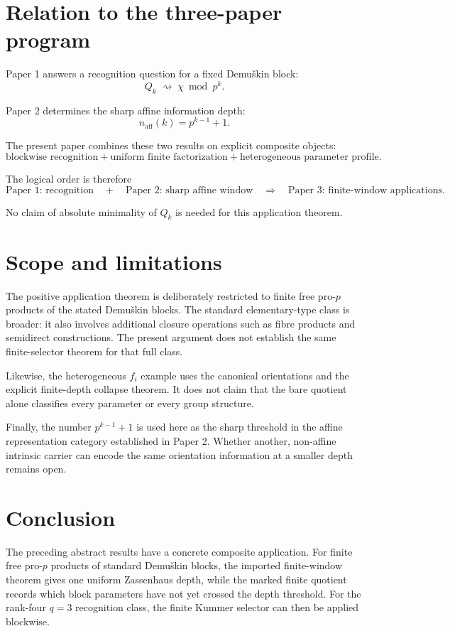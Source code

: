 \documentclass[11pt]{article}
\begin{document}
\section{Relation to the three-paper program}

Paper 1 answers a recognition question for a fixed Demuškin block:
\[
Q_k\;\rightsquigarrow\;\chi\bmod p^k.
\]

Paper 2 determines the sharp affine information depth:
\[
n_{\mathrm{aff}}(k)=p^{k-1}+1.
\]

The present paper combines these two results on explicit composite objects:
\[
\boxed{
\text{blockwise recognition}
+
\text{uniform finite factorization}
+
\text{heterogeneous parameter profile}.
}
\]

The logical order is therefore
\[
\text{Paper 1: recognition}
\quad+\quad
\text{Paper 2: sharp affine window}
\quad\Longrightarrow\quad
\text{Paper 3: finite-window applications}.
\]

No claim of absolute minimality of $Q_k$ is needed for this application theorem.

\section{Scope and limitations}

The positive application theorem is deliberately restricted to finite free pro-$p$ products of the stated Demuškin blocks. The standard elementary-type class is broader: it also involves additional closure operations such as fibre products and semidirect constructions. The present argument does not establish the same finite-selector theorem for that full class.

Likewise, the heterogeneous $f_i$ example uses the canonical orientations and the explicit finite-depth collapse theorem. It does not claim that the bare quotient alone classifies every parameter or every group structure.

Finally, the number $p^{k-1}+1$ is used here as the sharp threshold in the affine representation category established in Paper 2. Whether another, non-affine intrinsic carrier can encode the same orientation information at a smaller depth remains open.

\section{Conclusion}

The preceding abstract results have a concrete composite application. For finite free pro-$p$ products of standard Demuškin blocks, the imported finite-window theorem gives one uniform Zassenhaus depth, while the marked finite quotient records which block parameters have not yet crossed the depth threshold. For the rank-four $q=3$ recognition class, the finite Kummer selector can then be applied blockwise.
\end{document}
